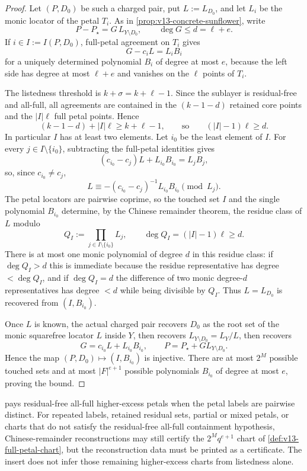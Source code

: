 \begin{proof}
Let $(P,D_0)$ be such a charged pair, put $L:=L_{D_0}$, and let $L_i$ be the monic locator of the petal $T_i$.  As in \cref{prop:v13-concrete-sunflower}, write
\[
        P-P_\star=G\,L_{Y\setminus D_0},
        \qquad \deg G\le d=\ell+e .
\]
If $i\in I:=I(P,D_0)$, full-petal agreement on $T_i$ gives
\[
        G-c_iL=L_iB_i
\]
for a uniquely determined polynomial $B_i$ of degree at most $e$, because the left side has degree at most $\ell+e$ and vanishes on the $\ell$ points of $T_i$.

The listedness threshold is $k+\sigma=k+\ell-1$.  Since the sublayer is residual-free and all-full, all agreements are contained in the $(k-1-d)$ retained core points and the $|I|\ell$ full petal points.  Hence
\[
        (k-1-d)+|I|\ell\ge k+\ell-1,
        \qquad\text{so}\qquad
        (|I|-1)\ell\ge d .
\]
In particular $I$ has at least two elements.  Let $i_0$ be the least element of $I$.  For every $j\in I\setminus\{i_0\}$, subtracting the full-petal identities gives
\[
        (c_{i_0}-c_j)L+L_{i_0}B_{i_0}=L_jB_j,
\]
so, since $c_{i_0}\ne c_j$,
\[
        L\equiv -(c_{i_0}-c_j)^{-1}L_{i_0}B_{i_0}\pmod {L_j}.
\]
The petal locators are pairwise coprime, so the touched set $I$ and the single polynomial $B_{i_0}$ determine, by the Chinese remainder theorem, the residue class of $L$ modulo
\[
        Q_I:=\prod_{j\in I\setminus\{i_0\}}L_j,
        \qquad \deg Q_I=(|I|-1)\ell\ge d .
\]
There is at most one monic polynomial of degree $d$ in this residue class: if $\deg Q_I>d$ this is immediate because the residue representative has degree $<\deg Q_I$, and if $\deg Q_I=d$ the difference of two monic degree-$d$ representatives has degree $<d$ while being divisible by $Q_I$.  Thus $L=L_{D_0}$ is recovered from $(I,B_{i_0})$.

Once $L$ is known, the actual charged pair recovers $D_0$ as the root set of the monic squarefree locator $L$ inside $Y$, then recovers $L_{Y\setminus D_0}=L_Y/L$, then recovers
\[
        G=c_{i_0}L+L_{i_0}B_{i_0},
        \qquad
        P=P_\star+G L_{Y\setminus D_0}.
\]
Hence the map $(P,D_0)\mapsto (I,B_{i_0})$ is injective.  There are at most $2^M$ possible touched sets and at most $|F|^{e+1}$ possible polynomials $B_{i_0}$ of degree at most $e$, proving the bound.
\end{proof}

\begin{remark}\label{rem:v13-higher-excess-cert}
 pays residual-free all-full higher-excess petals when the petal labels are pairwise distinct.  For repeated labels, retained residual sets, partial or mixed petals, or charts that do not satisfy the residual-free all-full containment hypothesis, Chinese-remainder reconstructions may still certify the $2^Mq^{e+1}$ chart of \cref{def:v13-full-petal-chart}, but the reconstruction data must be printed as a certificate.  The insert does not infer those remaining higher-excess charts from listedness alone.
\end{remark}

